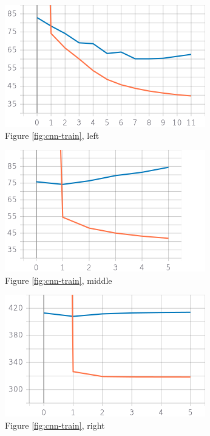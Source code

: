 \begin{figure}[H]
\includegraphics[width=\linewidth]{plots/cnn-training-history-2_conv_layers_deflating_kernel_size_7.png}
\caption{Figure \ref{fig:cnn-train}, left}
\end{figure}

\begin{figure}[H]
\includegraphics[width=\linewidth]{plots/cnn-training-history-1_conv_layers_deflating_kernel_size_7.png}
\caption{Figure \ref{fig:cnn-train}, middle}
\end{figure}

\begin{figure}[H]
\includegraphics[width=\linewidth]{plots/cnn-training-history-0_conv_layers_deflating_kernel_size_-1.png}
\caption{Figure \ref{fig:cnn-train}, right}
\end{figure}

